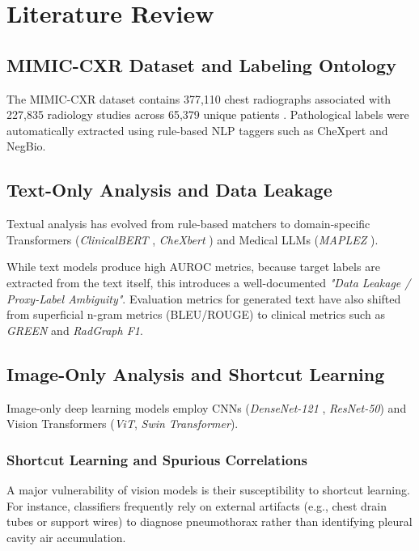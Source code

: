 \chapter{Literature Review}
\label{ch:literature_review}

\section{MIMIC-CXR Dataset and Labeling Ontology}
The MIMIC-CXR dataset contains 377,110 chest radiographs associated with 227,835 radiology studies across 65,379 unique patients \cite{johnson2019mimic}. Pathological labels were automatically extracted using rule-based NLP taggers such as CheXpert \cite{irvin2019chexpert} and NegBio.

\section{Text-Only Analysis and Data Leakage}
Textual analysis has evolved from rule-based matchers to domain-specific Transformers (\textit{ClinicalBERT} \cite{alsentzer2019publicly}, \textit{CheXbert} \cite{smit2020chexbert}) and Medical LLMs (\textit{MAPLEZ} \cite{maplez2024llm}).

While text models produce high AUROC metrics, because target labels are extracted from the text itself, this introduces a well-documented \textit{"Data Leakage / Proxy-Label Ambiguity"}. Evaluation metrics for generated text have also shifted from superficial n-gram metrics (BLEU/ROUGE) to clinical metrics such as \textit{GREEN} \cite{ostmeier2024green} and \textit{RadGraph F1}.

\section{Image-Only Analysis and Shortcut Learning}
Image-only deep learning models employ CNNs (\textit{DenseNet-121} \cite{rajpurkar2017chexnet}, \textit{ResNet-50}) and Vision Transformers (\textit{ViT}, \textit{Swin Transformer}).

\subsection{Shortcut Learning and Spurious Correlations}
A major vulnerability of vision models is their susceptibility to shortcut learning. For instance, classifiers frequently rely on external artifacts (e.g., chest drain tubes or support wires) to diagnose pneumothorax rather than identifying pleural cavity air accumulation.

